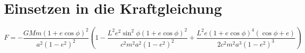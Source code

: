 \section{Einsetzen in die Kraftgleichung}
\[
F = -\frac{GMm (1 + e \cos \phi)^2}{a^2(1 - e^2)^2} \left( 1 - \frac{L^2 e^2 \sin^2 \phi (1 + e \cos \phi)^2}{c^2 m^2 a^2 (1 - e^2)^2} + \frac{L^2 e (1 + e \cos \phi)^4 (\cos \phi + e)}{2c^2 m^2 a^3 (1 - e^2)^3} \right)
\]